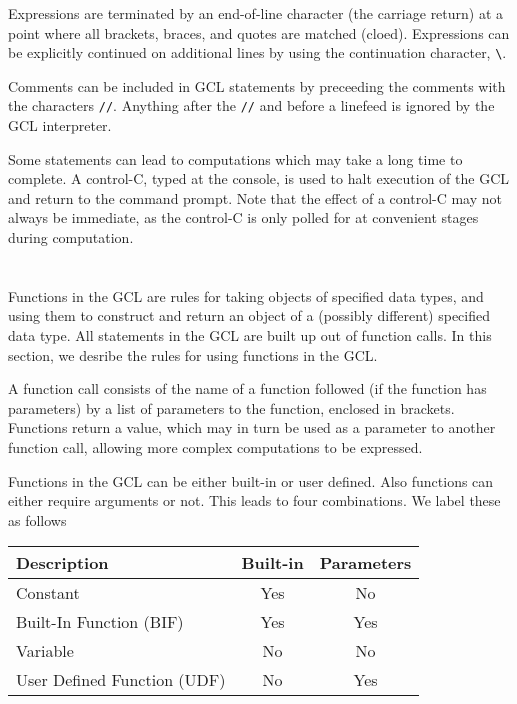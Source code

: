 Expressions are terminated by an end-of-line character (the carriage
return) at a point where all brackets, braces, and quotes are matched
(cloed).  Expressions can be explicitly continued on additional lines
by using the continuation character, \verb+\+.

Comments can be
included in GCL statements by preceeding the comments with the
characters \verb+//+.  Anything after the \verb+//+ and before a
linefeed is ignored by the GCL interpreter.

Some statements can lead to computations which may take a long time to
complete.  A control-C, typed at the console, is used to halt
execution of the GCL and return to the command prompt.  Note that the
effect of a control-C may not always be immediate, as the control-C is
only polled for at convenient stages during computation.

\section{}

Functions in the GCL are rules for taking objects of specified data
types, and using them to construct and return an object of a (possibly
different) specified data type.  All statements in the GCL are built
up out of function calls.  In this section, we desribe the rules for
using functions in the GCL.

A function call consists of the name of a function followed (if the
function has parameters) by a list of parameters to the function,
enclosed in brackets.  Functions return a value, which may in turn
be used as a parameter to another function call, allowing more complex
computations to be expressed.

Functions in the GCL can be either built-in or user defined.  Also
functions can either require arguments or not.  This leads to four
combinations.  We label these as follows

\medskip
\begin{center}
\begin{tabular} {|l||c|c|} 
\hline
Description & Built-in & Parameters\\ 
\hline
Constant & Yes & No \\ 
Built-In Function (BIF) & Yes & Yes \\ 
Variable & No & No \\ 
User Defined Function (UDF) & No & Yes \\ 
\hline
\end{tabular}
\end{center}

